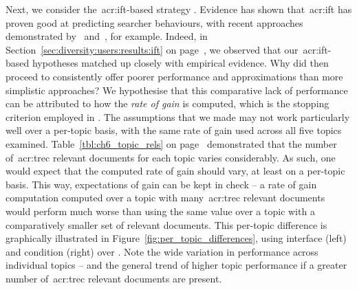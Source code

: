 Next, we consider the~\gls{acr:ift}-based strategy . Evidence has shown that~\gls{acr:ift} has proven good at predicting searcher behaviours, with recent approaches demonstrated by~\cite{ong2017scent_behaviour} and~\cite{azzopardi2018cwl}, for example. Indeed, in Section~\ref{sec:diversity:users:results:ift} on page~\pageref{sec:diversity:users:results:ift}, we observed that our~\gls{acr:ift}-based hypotheses matched up closely with empirical evidence. Why did  then proceed to consistently offer poorer performance and approximations than more simplistic approaches? We hypothesise that this comparative lack of performance can be attributed to how the \emph{rate of gain} is computed, which is the stopping criterion employed in . The assumptions that we made may not work particularly well over a per-topic basis, with the same rate of gain used across all five topics examined. Table~\ref{tbl:ch6_topic_rels} on page~\pageref{tbl:ch6_topic_rels} demonstrated that the number of~\gls{acr:trec} relevant documents for each topic varies considerably. As such, one would expect that the computed rate of gain should vary, at least on a per-topic basis. This way, expectations of gain can be kept in check -- a rate of gain computation computed over a topic with many~\gls{acr:trec} relevant documents would perform much worse than using the same value over a topic with a comparatively smaller set of relevant documents. This per-topic difference is graphically illustrated in Figure~\ref{fig:per_topic_differences}, using interface  (left) and condition  (right) over . Note the wide variation in performance across individual topics -- and the general trend of higher topic performance if a greater number of~\gls{acr:trec} relevant documents are present.


